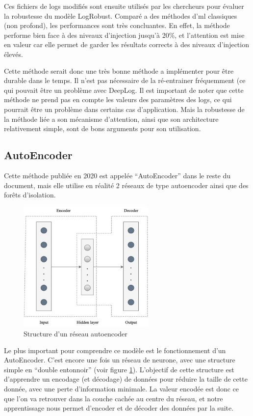 \documentclass[openany, 11pt]{memoir}
\begin{document}
Ces fichiers de \glspl{log} modifiés sont ensuite utilisés par les chercheurs pour évaluer la robustesse du modèle LogRobust. Comparé a des méthodes d'\gls{ml} classiques (non profond), les performances sont très concluantes. En effet, la méthode performe bien face à des niveaux d'injection jusqu'à 20\%, et l'attention est mise en valeur car elle permet de garder les résultats corrects à des niveaux d'injection élevés.

\bigskip
Cette méthode serait donc une très bonne méthode a implémenter pour être durable dans le temps. Il n'est pas nécessaire de la ré-entrainer fréquemment (ce qui pouvait être un problème avec DeepLog. Il est important de noter que cette méthode ne prend pas en compte les valeurs des paramètres des \glspl{log}, ce qui pourrait être un problème dans certains cas d'application. Mais la robustesse de la méthode liée a son mécanisme d'attention, ainsi que son architecture relativement simple, sont de bons arguments pour son utilisation.

\subsection{AutoEncoder}

Cette méthode publiée en 2020 \cite{autoencoder} est appelée ``AutoEncoder'' dans le reste du document, mais elle utilise en réalité 2 réseaux de type autoencoder ainsi que des forêts d'isolation.

\begin{figure}[ht]
	\centering
	\includegraphics[width=0.6\textwidth]{images/autoencoder.png}
	\caption{Structure d'un réseau autoencoder}
	\label{autoencoder}
\end{figure}

\bigskip
Le plus important pour comprendre ce modèle est le fonctionnement d'un AutoEncoder. C'est encore une fois un réseau de neurone, avec une structure simple en ``double entonnoir'' (voir figure \ref{autoencoder}). L'objectif de cette structure est d'apprendre un encodage (et décodage) de données pour réduire la taille de cette donnée, avec une perte d'information minimale. La valeur encodée est donc ce que l'on va retrouver dans la couche cachée au centre du réseau, et notre apprentissage nous permet d'encoder et de décoder des données par la suite.
\end{document}
